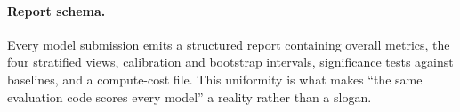 \paragraph{Report schema.}
Every model submission emits a structured report containing overall metrics,
the four stratified views, calibration and bootstrap intervals, significance
tests against baselines, and a compute-cost file. This uniformity is what makes
``the same evaluation code scores every model'' a reality rather than a slogan.
